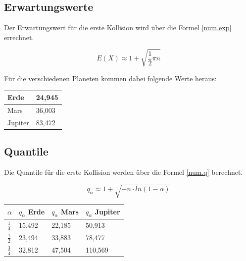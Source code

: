 \documentclass[../main.tex]{subfiles}
\begin{document}
\subsection{Erwartungswerte}

Der Erwartungswert für die erste Kollision wird über die Formel \ref{num.exp} errechnet.

\begin{equation}
 E(X) \approx 1 + \sqrt{\frac{1}{2} \pi n}
 \label{num.exp}
\end{equation}

Für die verschiedenen Planeten kommen dabei folgende Werte heraus:

\begin{center}
\begin{tabular}{|l|l|}
\hline
Erde & 24,945\\ \hline
Mars & 36,003\\ \hline
Jupiter & 83,472 \\ \hline
\end{tabular}
\end{center}

\subsection{Quantile}

Die Quantile für die erste Kollision werden über die Formel \ref{num.q} berechnet.

\begin{equation}
 q_{\alpha} \approx 1 + \sqrt{-n \cdot ln(1-\alpha)}
 \label{num.q}
\end{equation}

\begin{table}[h]
\centering
\begin{tabular}{|l|l|l|l|}
\hline
$\alpha$      & $q_{\alpha}$ Erde & $q_{\alpha}$ Mars & $q_{\alpha}$ Jupiter \\ \hline
$\frac{1}{4}$ & 15,492            & 22,185            & 50,913               \\
$\frac{1}{2}$ & 23,494            & 33,883            & 78,477               \\
$\frac{3}{4}$ & 32,812            & 47,504            & 110,569              \\ \hline
\end{tabular}
\end{table}
\end{document}
